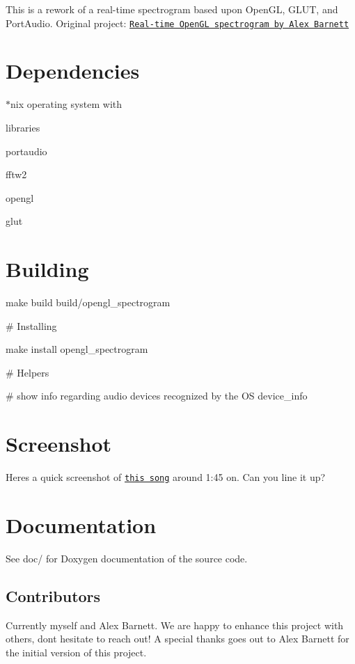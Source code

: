 This is a rework of a real-\/time spectrogram based upon Open\+GL, G\+L\+UT, and Port\+Audio. Original project\+: \href{https://math.dartmouth.edu/~ahb/software/#glspect}{\tt Real-\/time Open\+GL spectrogram by Alex Barnett}

\section*{Dependencies}


\begin{DoxyItemize}
\item $\ast$nix operating system with
\item libraries
\begin{DoxyItemize}
\item portaudio
\item fftw2
\item opengl
\item glut
\end{DoxyItemize}
\end{DoxyItemize}

\section*{Building}


\begin{DoxyCode}
make build
build/opengl\_spectrogram
\end{DoxyCode}


\# Installing 
\begin{DoxyCode}
make install
opengl\_spectrogram
\end{DoxyCode}


\# Helpers 
\begin{DoxyCode}
# show info regarding audio devices recognized by the OS
device\_info
\end{DoxyCode}


\section*{Screenshot}

Here\textquotesingle{}s a quick screenshot of \href{https://www.youtube.com/watch?v=n70c3Dzw-ZM}{\tt this song} around 1\+:45 on. Can you line it up?



\section*{Documentation}

See doc/ for Doxygen documentation of the source code.

\subsection*{Contributors}

Currently myself and Alex Barnett. We are happy to enhance this project with others, don\textquotesingle{}t hesitate to reach out! A special thanks goes out to Alex Barnett for the initial version of this project. 